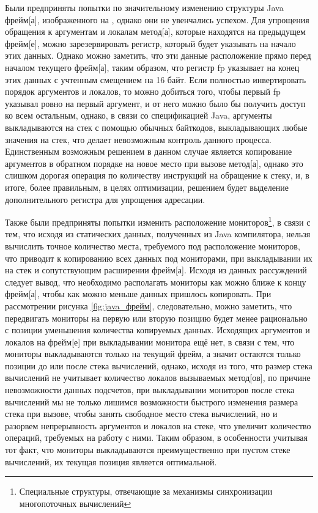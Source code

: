 
Были предприняты попытки по значительному изменению структуры Java \gls{фрейм}[а], изображенного на , однако они не увенчались успехом. Для упрощения обращения к аргументам и локалам \gls{метод}[а], которые находятся на предыдущем \gls{фрейм}[е], можно зарезервировать регистр, который будет указывать на начало этих данных. Однако можно заметить, что эти данные расположение прямо перед началом текущего \gls{фрейм}[а], таким образом, что регистр fp указывает на конец этих данных с учтенным смещением на 16 байт. Если полностью инвертировать порядок аргументов и локалов, то можно добиться того, чтобы первый fp указывал ровно на первый аргумент, и от него можно было бы получить доступ ко всем остальным, однако, в связи со спецификацией Java, аргументы выкладываются на стек с помощью обычных байткодов, выкладывающих любые значения на стек, что делает невозможным контроль данного процесса. Единственным возможным решением в данном случае является копирование аргументов в обратном порядке на новое место при вызове \gls{метод}[а], однако это слишком дорогая операция по количеству инструкций на обращение к стеку, и, в итоге, более правильным, в целях оптимизации, решением будет выделение дополнительного регистра для упрощения адресации.

Также были предприняты попытки изменить расположение мониторов\footnote{Специальные структуры, отвечающие за механизмы синхронизации многопоточных вычислений}, в связи с тем, что исходя из статических данных, полученных из Java компилятора, нельзя вычислить точное количество места, требуемого под расположение мониторов, что приводит к копированию всех данных под мониторами, при выкладывании их на стек и сопутствующим расширении \gls{фрейм}[а]. Исходя из данных рассуждений следует вывод, что необходимо располагать мониторы как можно ближе к концу \gls{фрейм}[а], чтобы как можно меньше данных пришлось копировать. При рассмотрении рисунка \ref{fig:java_фрейм}, следовательно, можно заметить, что передвигать мониторы на первую или вторую позицию будет менее рационально с позиции уменьшения количества копируемых данных. Исходящих аргументов и локалов на \gls{фрейм}[е] при выкладывании монитора ещё нет, в связи с тем, что мониторы выкладываются только на текущий фрейм, а значит остаются только позиции до или после стека вычислений, однако, исходя из того, что размер стека вычислений не учитывает количество локалов вызываемых \gls{метод}[ов], по причине невозможности данных подсчетов, при выкладывании мониторов после стека вычислений мы не только лишимся возможности быстрого изменения размера стека при вызове, чтобы занять свободное место стека вычислений, но и разорвем непрерывность аргументов и локалов на стеке, что увеличит количество операций, требуемых на работу с ними. Таким образом, в особенности учитывая тот факт, что мониторы выкладываются преимущественно при пустом стеке вычислений, их текущая позиция является оптимальной.




